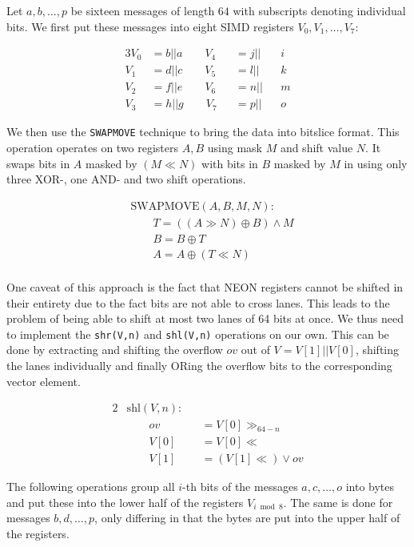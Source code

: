 Let $a,b,\dots,p$ be sixteen messages of length $64$ with subscripts denoting
individual bits. We first put these messages into eight SIMD registers
$V_0,V_1,\dots,V_7$:

\begin{alignat*}{3}
    V_0&=b||a\qquad V_4&&=j||&&i \\
    V_1&=d||c\qquad V_5&&=l||&&k \\
    V_2&=f||e\qquad V_6&&=n||&&m \\
    V_3&=h||g\qquad V_7&&=p||&&o
\end{alignat*}

We then use the \texttt{SWAPMOVE} technique to bring the data into bitslice
format. This operation operates on two registers $A,B$ using mask $M$ and shift
value $N$. It swaps bits in $A$ masked by $(M\ll N)$ with bits in $B$ masked by
$M$ in using only three XOR-, one AND- and two shift operations.

\begin{align*}
    &\text{SWAPMOVE}(A,B,M,N): \\
    &\qquad T=((A\gg N)\oplus B)\land M \\
    &\qquad B=B\oplus T \\
    &\qquad A=A\oplus (T\ll N) \\
\end{align*}

One caveat of this approach is the fact that NEON registers cannot be shifted
in their entirety due to the fact bits are not able to cross lanes. This leads
to the problem of being able to shift at most two lanes of 64 bits at once. We
thus need to implement the \texttt{shr(V,n)} and \texttt{shl(V,n)} operations
on our own. This can be done by extracting and shifting the overflow $ov$ out
of $V=V[1]||V[0]$, shifting the lanes individually and finally ORing the
overflow bits to the corresponding vector element.

\begin{alignat*}{2}
    &\text{shl}(V,n): \\
    &\qquad ov&&=V[0]\gg_{64-n} \\
    &\qquad V[0]&&=V[0]\ll \\
    &\qquad V[1]&&=(V[1]\ll)\lor ov
\end{alignat*}

The following operations group all $i$-th bits of the messages $a,c,\dots,o$
into bytes and put these into the lower half of the registers $V_{i\bmod 8}$.
The same is done for messages $b,d,\dots,p$, only differing in that the bytes
are put into the upper half of the registers.

